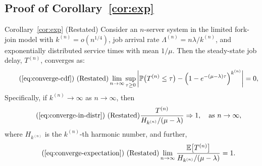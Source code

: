 \documentclass[sigconf]{acmart}
\newcommand{\thistheoremname}{}
\newtheorem*{genericthm*}{\thistheoremname}
\newenvironment{namedthm*}[1]
{\renewcommand{\thistheoremname}{#1}%
\begin{genericthm*}}
{\end{genericthm*}}
\renewcommand{\Pr}{\mathbb{P}} %
\newcommand{\expect}{\mathbb{E}} %
\newcommand{\supn}{^{(n)}}
\newcommand{\tod}{\Rightarrow}
\begin{document}
\subsection{Proof of Corollary~\ref{cor:exp}}\label{subsec:proof-response-time-infinite}
\begin{namedthm*}{Corollary~\ref{cor:exp} (Restated)}
Consider an $n$-server system in the limited fork-join model with $k\supn=o(n^{1/4})$, job arrival rate $\Lambda\supn=n\lambda/k\supn$, and exponentially distributed service times with mean $1/\mu$.  Then the steady-state job delay, $T\supn$, converges as:
\begin{equation}\tag*{(\ref{eq:converge-cdf}) (Restated)}
\lim_{n\to\infty}\sup_{\tau\ge 0}\left|\Pr\bigl(T\supn\le \tau\bigr)-\left(1-e^{-(\mu-\lambda)\tau}\right)^{k\supn}\right|=0,
\end{equation}
Specifically, if $k\supn\to\infty$ as $n\to\infty$, then
\begin{equation}\tag*{(\ref{eq:converge-in-distr}) (Restated)}
\frac{T\supn}{H_{k\supn}/(\mu-\lambda)}\tod 1,\quad\text{as }n\to\infty,
\end{equation}
where $H_{k\supn}$ is the $k\supn$-th harmonic number, and further,
\begin{equation}\tag*{(\ref{eq:converge-expectation}) (Restated)}
\lim_{n\to\infty}\frac{\expect\bigl[T\supn\bigr]}{H_{k\supn}/(\mu-\lambda)}=1.
\end{equation}
\end{namedthm*}
\end{document}

